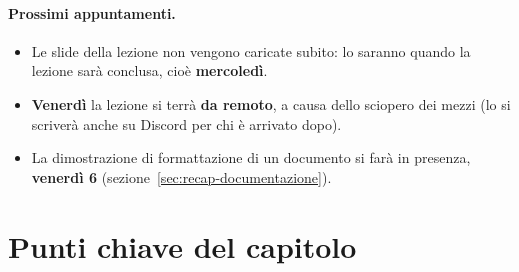\paragraph{Prossimi appuntamenti.}
\begin{itemize}
  \item Le slide della lezione non vengono caricate subito: lo saranno quando
        la lezione sarà conclusa, cioè \textbf{mercoledì}.
  \item \textbf{Venerdì} la lezione si terrà \textbf{da remoto}, a causa
        dello sciopero dei mezzi (lo si scriverà anche su Discord per chi è
        arrivato dopo).
  \item La dimostrazione di formattazione di un documento si farà in presenza,
        \textbf{venerdì 6} (sezione~\ref{sec:recap-documentazione}).
\end{itemize}

\section*{Punti chiave del capitolo}

